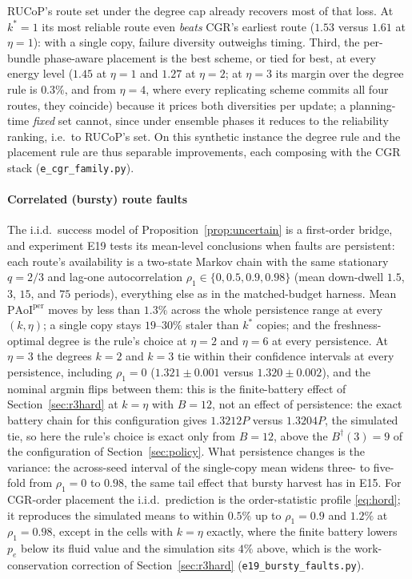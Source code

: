 \documentclass[twocolumn,3p,times,procedia]{elsarticle}
\theoremstyle{plain}
\theoremstyle{remark}
\newcommand{\PAoIper}{\mathrm{PAoI}^{\mathrm{per}}}
\newcommand{\peff}{p_e}
\begin{document}
RUCoP's route set under the degree cap already recovers most of that
loss. At $k^{\ast}{=}1$ its most reliable route even \emph{beats} CGR's
earliest route ($1.53$ versus $1.61$ at $\eta{=}1$): with a single copy,
failure diversity outweighs timing. Third, the per-bundle phase-aware
placement is the best scheme, or tied for best, at every energy level
($1.45$ at $\eta{=}1$ and $1.27$ at $\eta{=}2$; at $\eta{=}3$ its margin
over the degree rule is $0.3\%$, and from $\eta{=}4$, where every
replicating scheme commits all four routes, they coincide) because it
prices both diversities per update; a planning-time \emph{fixed} set
cannot,
since under ensemble phases it reduces to the reliability ranking, i.e.\
to RUCoP's set. On this synthetic instance the degree rule and the
placement rule are thus separable improvements, each composing with
the CGR stack (\texttt{e\_cgr\_family.py}).



\paragraph*{Correlated (bursty) route faults}
The i.i.d.\ success model of Proposition~\ref{prop:uncertain} is a
first-order bridge, and experiment E19 tests its mean-level
conclusions when faults are persistent: each route's availability is a
two-state Markov chain with the same stationary $q{=}2/3$ and lag-one
autocorrelation $\rho_1\in\{0,0.5,0.9,0.98\}$ (mean down-dwell $1.5$,
$3$, $15$, and $75$ periods), everything else as in the matched-budget
harness. Mean $\PAoIper$ moves by less than $1.3\%$ across the whole
persistence range at every $(k,\eta)$; a single copy stays $19$--$30\%$
staler than $k^{\ast}$ copies; and the freshness-optimal degree is the
rule's choice at $\eta{=}2$ and $\eta{=}6$ at every persistence. At
$\eta{=}3$ the degrees $k{=}2$ and $k{=}3$ tie within their confidence
intervals at every persistence, including $\rho_1{=}0$
($1.321\pm0.001$ versus $1.320\pm0.002$), and the nominal argmin flips
between them: this is the finite-battery effect of
Section~\ref{sec:r3hard} at $k{=}\eta$ with $B{=}12$, not an effect of
persistence: the exact battery chain for this configuration gives
$1.3212P$ versus $1.3204P$, the simulated tie, so here the rule's choice
is exact only from $B{=}12$, above the $B^{\dagger}(3){=}9$ of the
configuration of Section~\ref{sec:policy}. What persistence changes is the variance: the across-seed
interval of the single-copy mean widens three- to five-fold from
$\rho_1{=}0$ to $0.98$, the same tail effect that bursty harvest has in
E15. For CGR-order placement the i.i.d.\ prediction is the
order-statistic profile \eqref{eq:hord}; it reproduces the simulated
means to within $0.5\%$ up to $\rho_1{=}0.9$ and $1.2\%$ at
$\rho_1{=}0.98$, except in the cells with $k{=}\eta$ exactly, where the
finite battery lowers $\peff$ below its fluid value and the simulation
sits $4\%$ above, which is the work-conservation correction of
Section~\ref{sec:r3hard} (\texttt{e19\_bursty\_faults.py}).
\end{document}
